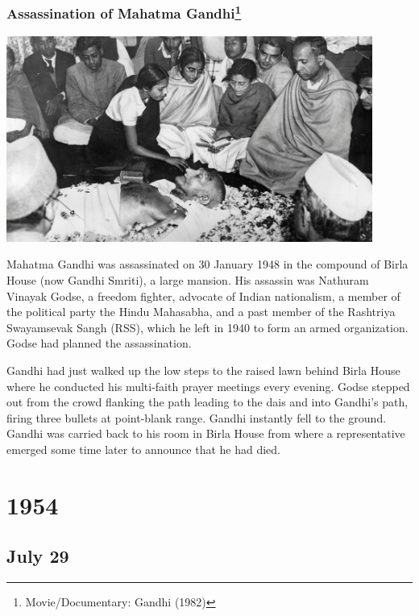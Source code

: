 \documentclass[11pt]{report}
\begin{document}
\subsection{Assassination of Mahatma Gandhi\protect\footnote{Movie/Documentary: Gandhi (1982)}}
\vspace{2mm}\begin{center}\includegraphics[width=12cm]{./img/gandhiDead.jpg}\end{center}
Mahatma Gandhi was assassinated on 30 January 1948 in the compound of Birla House (now Gandhi Smriti), a large mansion. His assassin was Nathuram Vinayak Godse, a freedom fighter, advocate of Indian nationalism, a member of the political party the Hindu Mahasabha, and a past member of the Rashtriya Swayamsevak Sangh (RSS), which he left in 1940 to form an armed organization. Godse had planned the assassination.

Gandhi had just walked up the low steps to the raised lawn behind Birla House where he conducted his multi-faith prayer meetings every evening. Godse stepped out from the crowd flanking the path leading to the dais and into Gandhi's path, firing three bullets at point-blank range. Gandhi instantly fell to the ground. Gandhi was carried back to his room in Birla House from where a representative emerged some time later to announce that he had died.

\chapter{1954}
\section{July 29}
\end{document}
